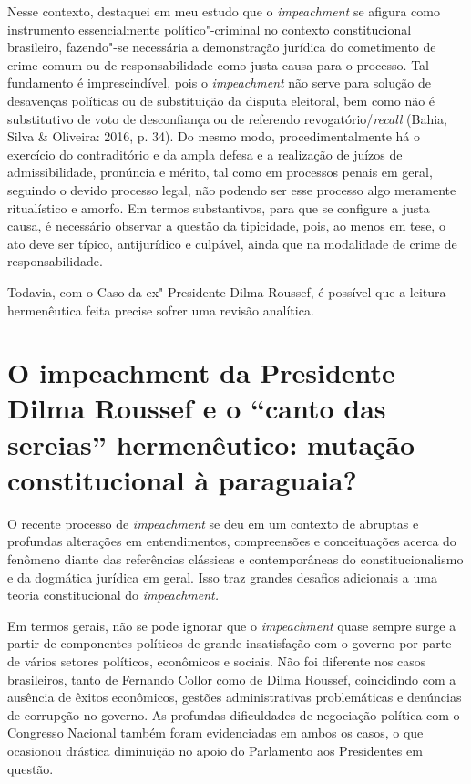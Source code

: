 Nesse contexto, destaquei em meu estudo que o \emph{impeachment} se
afigura como instrumento essencialmente político"-criminal no contexto
constitucional brasileiro, fazendo"-se necessária a demonstração jurídica
do cometimento de crime comum ou de responsabilidade como justa causa
para o processo. Tal fundamento é imprescindível, pois o
\emph{impeachment} não serve para solução de desavenças políticas ou de
substituição da disputa eleitoral, bem como não é substitutivo de voto
de desconfiança ou de referendo revogatório/\emph{recall} (Bahia, Silva
\& Oliveira: 2016, p. 34). Do mesmo modo, procedimentalmente há o
exercício do contraditório e da ampla defesa e a realização de juízos de
admissibilidade, pronúncia e mérito, tal como em processos penais em
geral, seguindo o devido processo legal, não podendo ser esse processo
algo meramente ritualístico e amorfo. Em termos substantivos, para que
se configure a justa causa, é necessário observar a questão da
tipicidade, pois, ao menos em tese, o ato deve ser típico, antijurídico
e culpável, ainda que na modalidade de crime de responsabilidade.

Todavia, com o Caso da ex"-Presidente Dilma Roussef, é possível que a
leitura hermenêutica feita precise sofrer uma revisão analítica.

\section{O impeachment da Presidente Dilma Roussef e o ``canto
  das sereias'' hermenêutico: mutação constitucional à paraguaia?}


O recente processo de \emph{impeachment} se deu em um contexto de
abruptas e profundas alterações em entendimentos, compreensões e
conceituações acerca do fenômeno diante das referências clássicas e
contemporâneas do constitucionalismo e da dogmática jurídica em geral.
Isso traz grandes desafios adicionais a uma teoria constitucional do
\emph{impeachment.}

Em termos gerais, não se pode ignorar que o \emph{impeachment} quase
sempre surge a partir de componentes políticos de grande insatisfação
com o governo por parte de vários setores políticos, econômicos e
sociais. Não foi diferente nos casos brasileiros, tanto de Fernando
Collor como de Dilma Roussef, coincidindo com a ausência de êxitos
econômicos, gestões administrativas problemáticas e denúncias de
corrupção no governo. As profundas dificuldades de negociação política
com o Congresso Nacional também foram evidenciadas em ambos os casos, o
que ocasionou drástica diminuição no apoio do Parlamento aos Presidentes
em questão.

